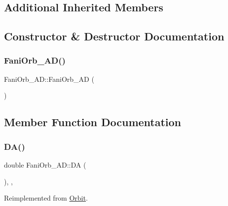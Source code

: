 \subsection*{Additional Inherited Members}


\subsection{Constructor \& Destructor Documentation}
\mbox{\label{class_fani_orb___a_d_a432479ba69600db08a1ffd2b0d6c3af5}} 
\subsubsection{\texorpdfstring{Fani\+Orb\+\_\+\+A\+D()}{FaniOrb\_AD()}}
{\footnotesize\ttfamily Fani\+Orb\+\_\+\+A\+D\+::\+Fani\+Orb\+\_\+\+AD (\begin{DoxyParamCaption}{ }\end{DoxyParamCaption})\hspace{0.3cm}{\ttfamily [inline]}}



\subsection{Member Function Documentation}
\mbox{\label{class_fani_orb___a_d_a9df0d91b4d07869b53c894da8d60ba14}} 
\subsubsection{\texorpdfstring{D\+A()}{DA()}}
{\footnotesize\ttfamily double Fani\+Orb\+\_\+\+A\+D\+::\+DA (\begin{DoxyParamCaption}{ }\end{DoxyParamCaption})\hspace{0.3cm}{\ttfamily [override]}, {\ttfamily [private]}, {\ttfamily [virtual]}}



Reimplemented from \hyperlink{class_orbit_a258deda1207d23b2ce6285b55e216d4f}{Orbit}.

\mbox{\label{class_fani_orb___a_d_a143c3e6457bed241959abb5c939237ac}} 

